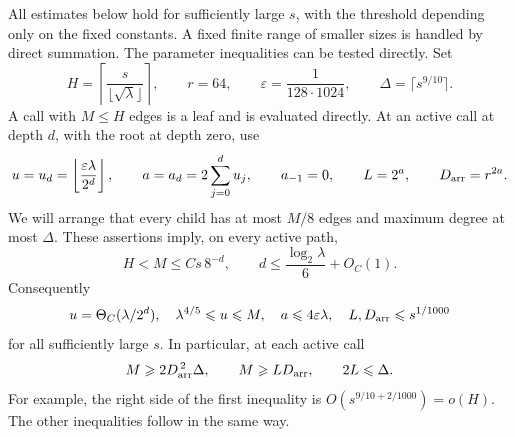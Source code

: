 All estimates below hold for sufficiently large $s$, with the
threshold depending only on the fixed constants.  A fixed finite
range of smaller sizes is handled by direct summation. The parameter
inequalities can be tested directly.  Set
\[
 H=\left\lceil\frac{s}{\lfloor\sqrt\lambda\rfloor}\right\rceil,
 \qquad r=64,\qquad \varepsilon=\frac1{128\cdot1024},
 \qquad \Delta=\lceil s^{9/10}\rceil.
\]
A call with $M\le H$ edges is a leaf and is evaluated directly.
At an active call at depth $d$, with the root at depth zero, use
\begin{equation}\label{eq:tensor-parameters}
 u=u_d=\left\lfloor\frac{\varepsilon\lambda}{2^d}\right\rfloor,
 \qquad a=a_d=2\sum_{j=0}^d u_j,\qquad
 a_{-1}=0,\qquad L=2^a,\qquad D_{\rm arr}=r^{2a}.
\end{equation}
We will arrange that every child has at most $M/8$ edges and maximum
degree at most $\Delta$.  These assertions imply, on every active path,
\[
 H<M\le Cs\,8^{-d},\qquad
 d\le\frac{\log_2\lambda}{6}+O_C(1).
\]
Consequently
\begin{equation}\label{eq:tensor-parameter-bounds}
 u=\Theta_C(\lambda/2^d),\quad
 \lambda^{4/5}\le u\le M,\quad
 a\le4\varepsilon\lambda,\quad
 L,D_{\rm arr}\le s^{1/1000}
\end{equation}
for all sufficiently large $s$.  In particular, at each active call
\begin{equation}\label{eq:tensor-packing-conditions}
 M\ge2D_{\rm arr}^{\,2}\Delta,\qquad
 M\ge L D_{\rm arr},\qquad 2L\le\Delta.
\end{equation}
For example, the right side of the first inequality is
$O(s^{9/10+2/1000})=o(H)$.  The other inequalities follow in the
same way.

